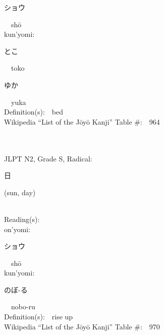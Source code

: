 \begin{multicols}{2}
{\hspace*{2em}}{\begin{CJK}{UTF8}{min} ショウ \end{CJK}}\ \ sh\=o\ \ \\
{\hspace*{1em}}kun'yomi:\ \ \\
{\hspace*{2em}}{\begin{CJK}{UTF8}{min} とこ \end{CJK}}\ \ toko\ \ \\
{\hspace*{2em}}{\begin{CJK}{UTF8}{min} ゆか \end{CJK}}\ \ yuka\ \ \\
Definition(s):\ \ bed \\
Wikipedia ``List of the J\=oy\=o Kanji'' Table \#:\ \ 964 \\
\ \ \\
{\fontsize{34pt}{40pt}  }\ \ \\  %
{JLPT N2, Grade S, Radical:\ \ {\begin{CJK}{UTF8}{min} 日 \end{CJK}} (sun, day) } \\
Reading(s):\ \ \\
{\hspace*{1em}}on'yomi:\ \ \\
{\hspace*{2em}}{\begin{CJK}{UTF8}{min} ショウ \end{CJK}}\ \ sh\=o\ \ \\
{\hspace*{1em}}kun'yomi:\ \ \\
{\hspace*{2em}}{\begin{CJK}{UTF8}{min} のぼ-る \end{CJK}}\ \ nobo-ru\ \ \\
Definition(s):\ \ rise up \\
Wikipedia ``List of the J\=oy\=o Kanji'' Table \#:\ \ 970 \\
\ \ \\
{\fontsize{34pt}{40pt}  }\ \ \\  %

\end{multicols}
